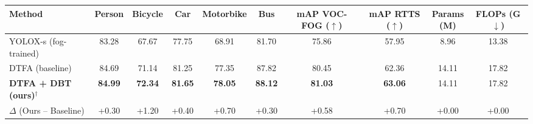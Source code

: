 \documentclass[8pt,a4paper]{article}
\begin{document}
\begin{center}


\label{tab:results}

\small
\setlength{\tabcolsep}{3.5pt}

\begin{tabularx}{\linewidth}{
    @{}X c c c c c c c c c@{}
}

\toprule

\textbf{Method}
& \textbf{Person} & \textbf{Bicycle} & \textbf{Car} & \textbf{Motorbike} & \textbf{Bus}
& \makecell{\textbf{mAP}\\\textbf{VOC-FOG} ($\uparrow$)}
& \makecell{\textbf{mAP}\\\textbf{RTTS} ($\uparrow$)}
& \makecell{\textbf{Params}\\(M)}
& \makecell{\textbf{FLOPs}\\(G $\downarrow$)}
\\

\midrule

YOLOX-s (fog-trained)
& 83.28 & 67.67 & 77.75 & 68.91 & 81.70 & 75.86 & 57.95 & 8.96 & 13.38 \\

DTFA (baseline)
& 84.69 & 71.14 & 81.25 & 77.35 & 87.82 & 80.45 & 62.36 & 14.11 & 17.82 \\

\textbf{DTFA + DBT (ours)}$^\dagger$
& \textbf{84.99} & \textbf{72.34} & \textbf{81.65} & \textbf{78.05} & \textbf{88.12} & \textbf{81.03} & \textbf{63.06} & 14.11 & 17.82 \\

\midrule

$\Delta$ (Ours -- Baseline)
& +0.30 & +1.20 & +0.40 & +0.70 & +0.30 & +0.58 & +0.70 & +0.00 & +0.00 \\

\bottomrule

\end{tabularx}

\end{center}
\end{document}
